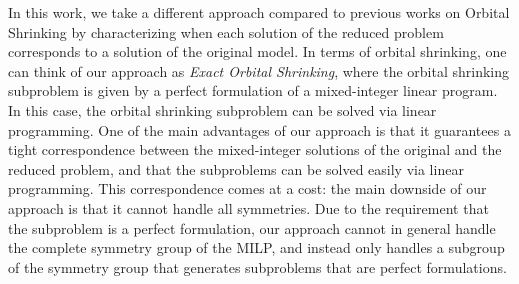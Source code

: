 \documentclass[pdflatex,sn-mathphys-num]{sn-jnl}%
\theoremstyle{thmstyleone}%
\theoremstyle{thmstylethree}%
\theoremstyle{thmstyletwo}%
\begin{document}
In this work, we take a different approach compared to previous works on Orbital Shrinking by characterizing when each solution of the reduced problem corresponds to a solution of the original model. In terms of orbital shrinking, one can think of our approach as \emph{Exact Orbital Shrinking}, where the orbital shrinking subproblem is given by a perfect formulation of a mixed-integer linear program. In this case, the orbital shrinking subproblem can be solved via linear programming. One of the main advantages of our approach is that it guarantees a tight correspondence between the mixed-integer solutions of the original and the reduced problem, and that the subproblems can be solved easily via linear programming. This correspondence comes at a cost: the main downside of our approach is that it cannot handle all symmetries. Due to the requirement that the subproblem is a perfect formulation, our approach cannot in general handle the complete symmetry group of the MILP, and instead only handles a subgroup of the symmetry group that generates subproblems that are perfect formulations.\\
\end{document}
